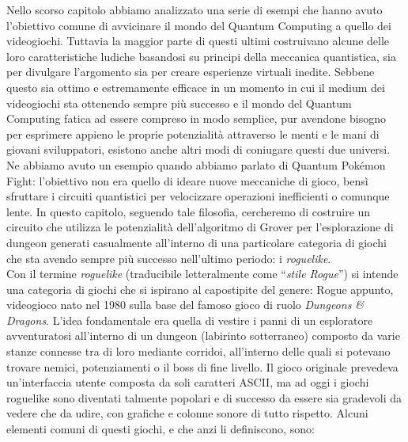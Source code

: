\documentclass{book}
\theoremstyle{definition}
\theoremstyle{definition}
\theoremstyle{definition}
\theoremstyle{plain}
\theoremstyle{plain}
\theoremstyle{plain}
\theoremstyle{plain}
\begin{document}
Nello scorso capitolo abbiamo analizzato una serie di esempi che hanno avuto l'obiettivo comune di avvicinare il mondo del Quantum Computing a quello dei videogiochi. Tuttavia la maggior parte di questi ultimi costruivano alcune delle loro caratteristiche ludiche basandosi su principi della meccanica quantistica, sia per divulgare l'argomento sia per creare esperienze virtuali inedite. Sebbene questo sia ottimo e estremamente efficace in un momento in cui il medium dei videogiochi sta ottenendo sempre più successo e il mondo del Quantum Computing fatica ad essere compreso in modo semplice, pur avendone bisogno per esprimere appieno le proprie potenzialità attraverso le menti e le mani di giovani sviluppatori, esistono anche altri modi di coniugare questi due universi. Ne abbiamo avuto un esempio quando abbiamo parlato di Quantum Pokémon Fight\cite{quantum_pokemon_fight}: l'obiettivo non era quello di ideare nuove meccaniche di gioco, bensì sfruttare i circuiti quantistici per velocizzare operazioni inefficienti o comunque lente. In questo capitolo, seguendo tale filosofia, cercheremo di costruire un circuito che utilizza le potenzialità dell'algoritmo di Grover per l'esplorazione di dungeon generati casualmente all'interno di una particolare categoria di giochi che sta avendo sempre più successo nell'ultimo periodo: i \textit{roguelike}\cite{wiki:Roguelike}. \\
Con il termine \textit{roguelike} (traducibile letteralmente come ``\textit{stile Rogue}'') si intende una categoria di giochi che si ispirano al capostipite del genere: Rogue appunto, videogioco nato nel 1980 sulla base del famoso gioco di ruolo \textit{Dungeons \& Dragons}. L'idea fondamentale era quella di vestire i panni di un esploratore avventuratosi all'interno di un dungeon (labirinto sotterraneo) composto da varie stanze connesse tra di loro mediante corridoi, all'interno delle quali si potevano trovare nemici, potenziamenti o il boss di fine livello. Il gioco originale prevedeva un'interfaccia utente composta da soli caratteri ASCII, ma ad oggi i giochi roguelike sono diventati talmente popolari e di successo da essere sia gradevoli da vedere che da udire, con grafiche e colonne sonore di tutto rispetto. Alcuni elementi comuni di questi giochi, e che anzi li definiscono, sono:
\end{document}
